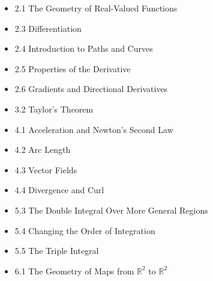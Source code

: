 \documentclass[11pt]{article}
\theoremstyle{plain}
\theoremstyle{definition}
\theoremstyle{remark}
\newcommand{\<}{\langle}
\renewcommand{\>}{\rangle}
\begin{document}
\begin{itemize}
  \item 2.1 The Geometry of Real-Valued Functions
  \item 2.3 Differentiation
  \item 2.4 Introduction to Paths and Curves
  \item 2.5 Properties of the Derivative
  \item 2.6 Gradients and Directional Derivatives
  \item 3.2 Taylor's Theorem
  \item 4.1 Acceleration and Newton's Second Law
  \item 4.2 Arc Length
  \item 4.3 Vector Fields
  \item 4.4 Divergence and Curl
  \item 5.3 The Double Integral Over More General Regions
  \item 5.4 Changing the Order of Integration
  \item 5.5 The Triple Integral
  \item 6.1 The Geometry of Maps from \(\mathbb R^2\) to \(\mathbb R^2\)



\end{itemize}
\end{document}
